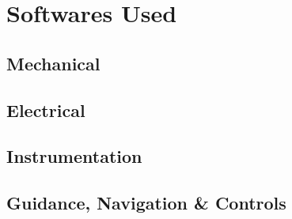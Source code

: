 \chapter{Softwares Used}
\thispagestyle{fancy}

\section*{Mechanical}
\blindtext

\section*{Electrical}
\blindtext

\section*{Instrumentation}
\blindtext

\section*{Guidance, Navigation \& Controls}
\blindtext
